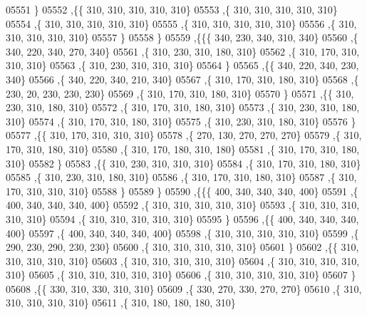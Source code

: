 \begin{DoxyCode}
05551     \}
05552    ,\{\{   310,   310,   310,   310,   310\}
05553     ,\{   310,   310,   310,   310,   310\}
05554     ,\{   310,   310,   310,   310,   310\}
05555     ,\{   310,   310,   310,   310,   310\}
05556     ,\{   310,   310,   310,   310,   310\}
05557     \}
05558    \}
05559   ,\{\{\{   340,   230,   340,   310,   340\}
05560     ,\{   340,   220,   340,   270,   340\}
05561     ,\{   310,   230,   310,   180,   310\}
05562     ,\{   310,   170,   310,   310,   310\}
05563     ,\{   310,   230,   310,   310,   310\}
05564     \}
05565    ,\{\{   340,   220,   340,   230,   340\}
05566     ,\{   340,   220,   340,   210,   340\}
05567     ,\{   310,   170,   310,   180,   310\}
05568     ,\{   230,    20,   230,   230,   230\}
05569     ,\{   310,   170,   310,   180,   310\}
05570     \}
05571    ,\{\{   310,   230,   310,   180,   310\}
05572     ,\{   310,   170,   310,   180,   310\}
05573     ,\{   310,   230,   310,   180,   310\}
05574     ,\{   310,   170,   310,   180,   310\}
05575     ,\{   310,   230,   310,   180,   310\}
05576     \}
05577    ,\{\{   310,   170,   310,   310,   310\}
05578     ,\{   270,   130,   270,   270,   270\}
05579     ,\{   310,   170,   310,   180,   310\}
05580     ,\{   310,   170,   180,   310,   180\}
05581     ,\{   310,   170,   310,   180,   310\}
05582     \}
05583    ,\{\{   310,   230,   310,   310,   310\}
05584     ,\{   310,   170,   310,   180,   310\}
05585     ,\{   310,   230,   310,   180,   310\}
05586     ,\{   310,   170,   310,   180,   310\}
05587     ,\{   310,   170,   310,   310,   310\}
05588     \}
05589    \}
05590   ,\{\{\{   400,   340,   340,   340,   400\}
05591     ,\{   400,   340,   340,   340,   400\}
05592     ,\{   310,   310,   310,   310,   310\}
05593     ,\{   310,   310,   310,   310,   310\}
05594     ,\{   310,   310,   310,   310,   310\}
05595     \}
05596    ,\{\{   400,   340,   340,   340,   400\}
05597     ,\{   400,   340,   340,   340,   400\}
05598     ,\{   310,   310,   310,   310,   310\}
05599     ,\{   290,   230,   290,   230,   230\}
05600     ,\{   310,   310,   310,   310,   310\}
05601     \}
05602    ,\{\{   310,   310,   310,   310,   310\}
05603     ,\{   310,   310,   310,   310,   310\}
05604     ,\{   310,   310,   310,   310,   310\}
05605     ,\{   310,   310,   310,   310,   310\}
05606     ,\{   310,   310,   310,   310,   310\}
05607     \}
05608    ,\{\{   330,   310,   330,   310,   310\}
05609     ,\{   330,   270,   330,   270,   270\}
05610     ,\{   310,   310,   310,   310,   310\}
05611     ,\{   310,   180,   180,   180,   310\}

\end{DoxyCode}
